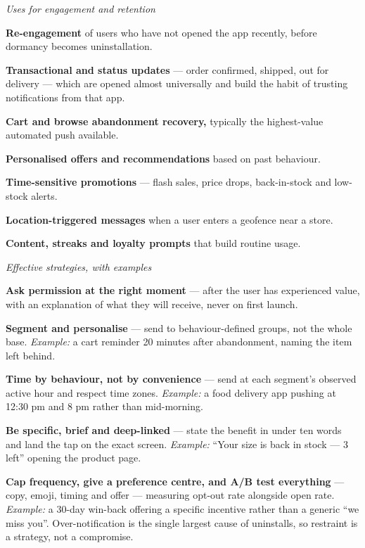 \begin{qlist}
\textit{Uses for engagement and retention}
\begin{apts}
\item \textbf{Re-engagement} of users who have not opened the app recently,
      before dormancy becomes uninstallation.
\item \textbf{Transactional and status updates} --- order confirmed, shipped,
      out for delivery --- which are opened almost universally and build the
      habit of trusting notifications from that app.
\item \textbf{Cart and browse abandonment recovery,} typically the highest-value
      automated push available.
\item \textbf{Personalised offers and recommendations} based on past behaviour.
\item \textbf{Time-sensitive promotions} --- flash sales, price drops,
      back-in-stock and low-stock alerts.
\item \textbf{Location-triggered messages} when a user enters a geofence near a
      store.
\item \textbf{Content, streaks and loyalty prompts} that build routine usage.
\end{apts}

\textit{Effective strategies, with examples}
\begin{apts}\setcounter{enumi}{7}
\item \textbf{Ask permission at the right moment} --- after the user has
      experienced value, with an explanation of what they will receive, never on
      first launch.
\item \textbf{Segment and personalise} --- send to behaviour-defined groups, not
      the whole base. \emph{Example:} a cart reminder 20 minutes after
      abandonment, naming the item left behind.
\item \textbf{Time by behaviour, not by convenience} --- send at each segment's
      observed active hour and respect time zones. \emph{Example:} a food
      delivery app pushing at 12:30 pm and 8 pm rather than mid-morning.
\item \textbf{Be specific, brief and deep-linked} --- state the benefit in under
      ten words and land the tap on the exact screen. \emph{Example:} ``Your
      size is back in stock --- 3 left'' opening the product page.
\item \textbf{Cap frequency, give a preference centre, and A/B test everything}
      --- copy, emoji, timing and offer --- measuring opt-out rate alongside open
      rate. \emph{Example:} a 30-day win-back offering a specific incentive
      rather than a generic ``we miss you''. Over-notification is the single
      largest cause of uninstalls, so restraint is a strategy, not a compromise.
\end{apts}


\end{qlist}
